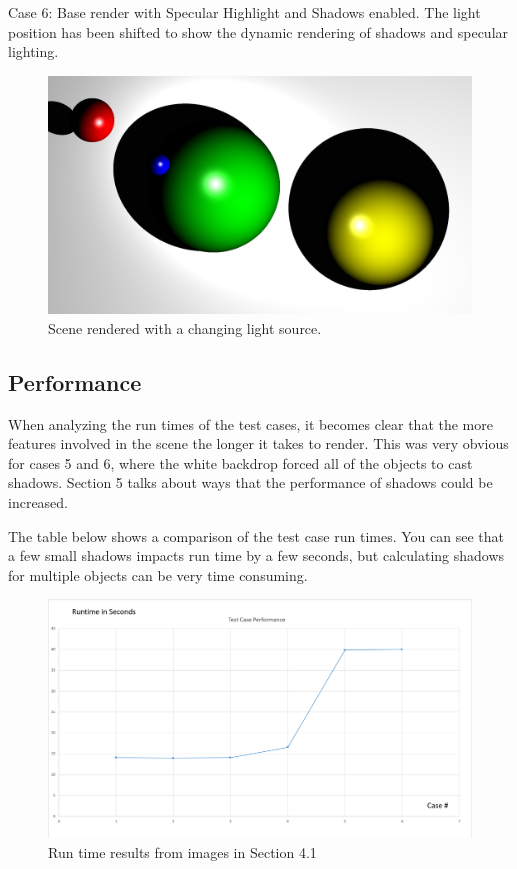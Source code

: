 \documentclass{article}
\begin{document}
Case 6: Base render with Specular Highlight and Shadows enabled. The light position has been shifted to show the dynamic rendering of shadows and specular lighting.
\begin{figure}[!htb]
  \includegraphics[width=\linewidth]{six.png}
  \caption{Scene rendered with a changing light source.}
  \label{fig:case6}
\end{figure}

\newpage
\subsection{Performance}
When analyzing the run times of the test cases, it becomes clear that the more features involved in the scene the longer it takes to render. This was very obvious for cases 5 and 6, where the white backdrop forced all of the objects to cast shadows. Section 5 talks about ways that the performance of shadows could be increased.

The table below shows a comparison of the test case run times. You can see that a few small shadows impacts run time by a few seconds, but calculating shadows for multiple objects can be very time consuming. 
\begin{figure}[H]
  \includegraphics[width=\linewidth]{performance-graph.PNG}
  \caption{Run time results from images in Section 4.1}
  \label{fig:graph}
\end{figure}
\end{document}
